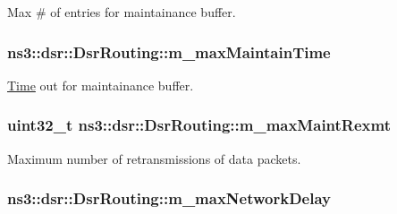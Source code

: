 Max \# of entries for maintainance buffer. 

\subsubsection[{\texorpdfstring{m\+\_\+max\+Maintain\+Time}{m_maxMaintainTime}}]{ ns3\+::dsr\+::\+Dsr\+Routing\+::m\+\_\+max\+Maintain\+Time\hspace{0.3cm}{\ttfamily [private]}}\hypertarget{classns3_1_1dsr_1_1DsrRouting_ac6b1dffa9665af0d6a71aa7b947962ee}{}\label{classns3_1_1dsr_1_1DsrRouting_ac6b1dffa9665af0d6a71aa7b947962ee}


\hyperlink{classns3_1_1Time}{Time} out for maintainance buffer. 

\subsubsection[{\texorpdfstring{m\+\_\+max\+Maint\+Rexmt}{m_maxMaintRexmt}}]{\setlength{\rightskip}{0pt plus 5cm}uint32\+\_\+t ns3\+::dsr\+::\+Dsr\+Routing\+::m\+\_\+max\+Maint\+Rexmt\hspace{0.3cm}{\ttfamily [private]}}\hypertarget{classns3_1_1dsr_1_1DsrRouting_aca44a3d45b57be61ec3e41774f20c1fb}{}\label{classns3_1_1dsr_1_1DsrRouting_aca44a3d45b57be61ec3e41774f20c1fb}


Maximum number of retransmissions of data packets. 

\subsubsection[{\texorpdfstring{m\+\_\+max\+Network\+Delay}{m_maxNetworkDelay}}]{ ns3\+::dsr\+::\+Dsr\+Routing\+::m\+\_\+max\+Network\+Delay\hspace{0.3cm}{\ttfamily [private]}}\hypertarget{classns3_1_1dsr_1_1DsrRouting_a5bf0e688251f1587471745f4355203c1}{}\label{classns3_1_1dsr_1_1DsrRouting_a5bf0e688251f1587471745f4355203c1}


